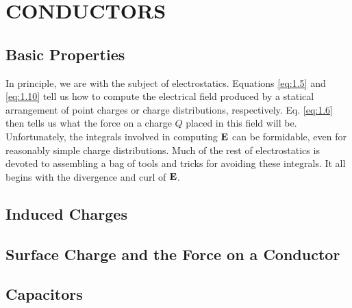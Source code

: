 \chapter{CONDUCTORS}\label{ch:5}

\section{Basic Properties}\label{sec:5.1} 

In principle, we are  with the subject of electrostatics. Equations \ref{eq:1.5} and \ref{eq:1.10} tell us how to compute the electrical field produced by a statical arrangement of point charges or charge distributions, respectively. Eq. \ref{eq:1.6} then tells us what the force on a charge $Q$ placed in this field will be. Unfortunately, the integrals involved in computing $\vb{E}$ can be formidable, even for reasonably simple charge distributions. Much of the rest of electrostatics is devoted to assembling a bag of tools and tricks for avoiding these integrals. It all begins with the divergence and curl of $\vb{E}$.





\section{Induced Charges}\label{sec:5.2}

\section{Surface Charge and the Force on a Conductor}\label{sec:5.3}

\section{Capacitors}\label{sec:5.4}


 
